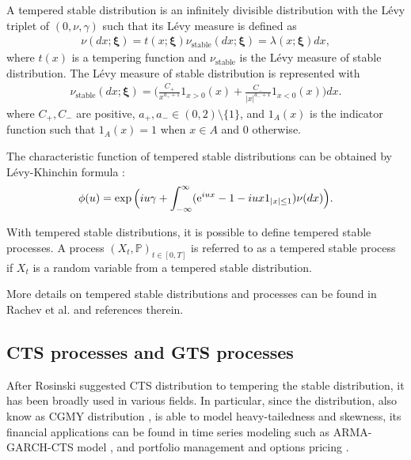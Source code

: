 \documentclass[preprint,11pt]{amsart}
\begin{document}
	A tempered stable distribution is an infinitely divisible distribution with the L\'evy triplet of $(0,\nu,\gamma)$ \cite{rachev2011financial} such that its L\'evy measure is defined as
	\begin{align}
	\label{levy_measure_ts}
		\nu(dx;\boldsymbol{\xi})=t(x;\boldsymbol{\xi})\nu_{\textrm{stable}}(dx;\boldsymbol{\xi})=\lambda(x;\boldsymbol{\xi})dx,
	\end{align}
	where $t(x)$ is a tempering function and $\nu_{\textrm{stable}}$ is the L\'evy measure of stable distribution. The L\'evy measure of stable distribution is represented with
	\begin{align}
	\label{levy_measure_stable}
		\nu_{\textrm{stable}}(dx;\boldsymbol{\xi})=\Big(\frac{C_+}{x^{a_++1}} 1_{x>0}(x)+\frac{C_-}{|x|^{a_-+1}} 1_{x<0}(x)\Big)dx.
	\end{align}
	where $C_+, C_-$ are positive, $a_+, a_-\in(0,2)\setminus \{1\}$, and $1_A(x)$ is the indicator function such that $1_A(x)=1$ when $x\in A$ and 0 otherwise. 
	
	The characteristic function of tempered stable distributions can be obtained by L\'evy-Khinchin formula \cite{rachev2011financial}:
	\begin{align}
	\label{charac_ftn_ts}
		\phi(u)=\exp\Big(iu\gamma+\int_{-\infty}^{\infty}({\rm e}^{iux}-1-iux 1_{|x|\leq1})\nu(dx)\Big).
	\end{align}
	
	With tempered stable distributions, it is possible to define tempered stable processes. A process $(X_t, \mathbb{P})_{t\in[0,T]}$ is referred to as a tempered stable process if $X_t$ is a random variable from a tempered stable distribution.
	
	More details on tempered stable distributions and processes can be found in Rachev et al. \cite{rachev2011financial} and references therein.
	
\subsection{CTS processes and GTS processes}
	After Rosinski suggested CTS distribution \cite{rosinski2007tempering} to tempering the stable distribution, it has been broadly used in various fields. In particular, since the distribution, also know as CGMY distribution \cite{carr2002fine}, is able to model heavy-tailedness and skewness, its financial applications can be found in time series modeling such as ARMA-GARCH-CTS model \cite{kim2009computing, kim2010tempered, kim2011time}, and portfolio management and options pricing \cite{tsuchida2012mean, beck2013empirical, choi2015reward, georgiev2015periodic, anand2017equity, kim2023deep, choi2024diversified}.
	
\end{document}
